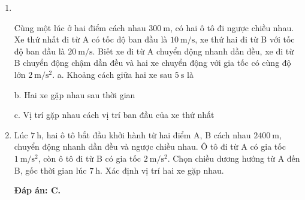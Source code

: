 \begin{enumerate}[label=\bfseries Câu \arabic*:,leftmargin=1.5cm]
\item {}\\
{Cùng một lúc ở hai điểm cách nhau $\SI{300}{\meter}$, có hai ô tô đi ngược chiều nhau. Xe thứ nhất đi từ A có tốc độ ban đầu là $\SI{10}{\meter/\second}$, xe thứ hai đi từ B với tốc độ ban đầu là $\SI{20}{\meter/\second}$. Biết xe đi từ A chuyển động nhanh dần đều, xe đi từ B chuyển động chậm dần đều và hai xe chuyển động với gia tốc có cùng độ lớn $\SI{2}{\meter/\second^2}$.
	a. Khoảng cách giữa hai xe sau $\SI{5}{\second}$ là 
	\begin{mcq}(4)
		\item $\SI{100}{\meter}$.
		\item $\SI{150}{\meter}$.
		\item $\SI{200}{\meter}$.
		\item $\SI{400}{\meter}$.
	\end{mcq}
b. Hai xe gặp nhau sau thời gian
c. Vị trí gặp nhau cách vị trí ban đầu của xe thứ nhất
}



	\item {}
	
	{Lúc $\SI{7}{\hour}$, hai ô tô bắt đầu khởi hành từ hai điểm A, B cách nhau $\SI{2400}{\meter}$, chuyển động nhanh dần đều và ngược chiều nhau. Ô tô đi từ A có gia tốc $\SI{1}{\meter / \second \squared}$, còn ô tô đi từ B có gia tốc $\SI{2}{\meter / \second \squared}$. Chọn chiều dương hướng từ A đến B, gốc thời gian lúc $\SI{7}{\hour}$. Xác định vị trí hai xe gặp nhau.
	}
	\hideall
	{	\textbf{Đáp án: C.}
		
}
\end{enumerate}
